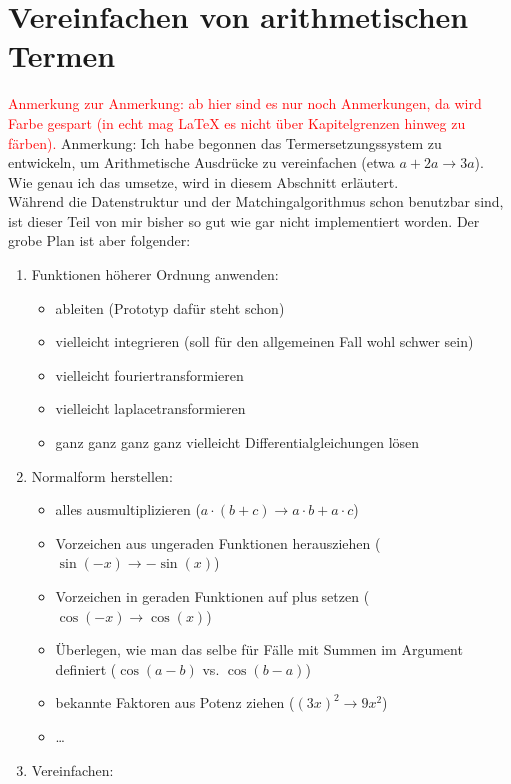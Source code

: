 \documentclass{scrartcl}
\begin{document}
\section{Vereinfachen von arithmetischen Termen}
\begin{itshape}
\textcolor{red} {Anmerkung zur Anmerkung: ab hier sind es nur noch Anmerkungen, da wird Farbe gespart (in echt mag \LaTeX{}  es nicht über Kapitelgrenzen hinweg zu färben).}
Anmerkung: Ich habe begonnen das Termersetzungssystem zu entwickeln, um Arithmetische Ausdrücke zu vereinfachen (etwa $a + 2 a \rightarrow 3 a$). Wie genau ich das umsetze, wird in diesem Abschnitt erläutert.
\\Während die Datenstruktur und der Matchingalgorithmus schon benutzbar sind, ist dieser Teil von mir bisher so gut wie gar nicht implementiert worden. Der grobe Plan ist aber folgender:
\begin{enumerate}
    \item Funktionen höherer Ordnung anwenden:
    \begin{itemize}
        \item ableiten (Prototyp dafür steht schon)
        \item vielleicht integrieren (soll für den allgemeinen Fall wohl schwer sein)
        \item vielleicht fouriertransformieren
        \item vielleicht laplacetransformieren
        \item ganz ganz ganz ganz vielleicht Differentialgleichungen lösen
    \end{itemize}
    \item Normalform herstellen:
    \begin{itemize}
        \item alles ausmultiplizieren ($a\cdot (b + c) \rightarrow a\cdot b + a\cdot c$)
        \item Vorzeichen aus ungeraden Funktionen herausziehen ($\sin(-x) \rightarrow -\sin(x)$)
        \item Vorzeichen in geraden Funktionen auf plus setzen ($\cos(-x) \rightarrow \cos(x)$)
        \item Überlegen, wie man das selbe für Fälle mit Summen im Argument definiert ($\cos(a - b)$ vs. $\cos(b - a)$)
        \item bekannte Faktoren aus Potenz ziehen ($(3 x)^2 \rightarrow 9 x^2$)
        \item \dots
    \end{itemize}
    \item Vereinfachen:

\end{enumerate}
\end{itshape}
\end{document}
